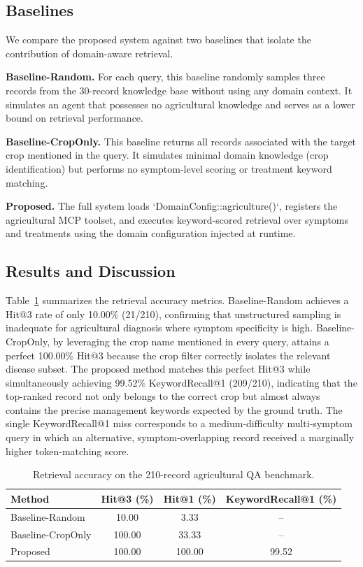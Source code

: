 \documentclass[11pt,a4paper]{article}
\begin{document}
\subsection{Baselines}

We compare the proposed system against two baselines that isolate the contribution of domain-aware retrieval.

\textbf{Baseline-Random.} For each query, this baseline randomly samples three records from the 30-record knowledge base without using any domain context. It simulates an agent that possesses no agricultural knowledge and serves as a lower bound on retrieval performance.

\textbf{Baseline-CropOnly.} This baseline returns all records associated with the target crop mentioned in the query. It simulates minimal domain knowledge (crop identification) but performs no symptom-level scoring or treatment keyword matching.

\textbf{Proposed.} The full system loads `DomainConfig::agriculture()`, registers the agricultural MCP toolset, and executes keyword-scored retrieval over symptoms and treatments using the domain configuration injected at runtime.

\subsection{Results and Discussion}

Table~\ref{tab:retrieval_results} summarizes the retrieval accuracy metrics. Baseline-Random achieves a Hit@3 rate of only 10.00\% (21/210), confirming that unstructured sampling is inadequate for agricultural diagnosis where symptom specificity is high. Baseline-CropOnly, by leveraging the crop name mentioned in every query, attains a perfect 100.00\% Hit@3 because the crop filter correctly isolates the relevant disease subset. The proposed method matches this perfect Hit@3 while simultaneously achieving 99.52\% KeywordRecall@1 (209/210), indicating that the top-ranked record not only belongs to the correct crop but almost always contains the precise management keywords expected by the ground truth. The single KeywordRecall@1 miss corresponds to a medium-difficulty multi-symptom query in which an alternative, symptom-overlapping record received a marginally higher token-matching score.

\begin{table}[htbp]
\centering
\caption{Retrieval accuracy on the 210-record agricultural QA benchmark.}
\label{tab:retrieval_results}
\begin{tabular}{lccc}
\hline
\textbf{Method} & \textbf{Hit@3 (\%)} & \textbf{Hit@1 (\%)} & \textbf{KeywordRecall@1 (\%)} \\
\hline
Baseline-Random    & 10.00  & 3.33   & --     \\
Baseline-CropOnly  & 100.00 & 33.33  & --     \\
Proposed           & 100.00 & 100.00 & 99.52  \\
\hline
\end{tabular}
\end{table}
\end{document}
